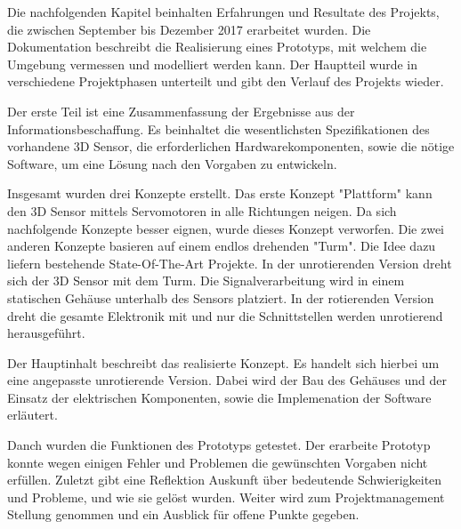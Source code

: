 Die nachfolgenden Kapitel beinhalten Erfahrungen und Resultate des Projekts, die zwischen September bis Dezember 2017 erarbeitet wurden. Die Dokumentation beschreibt die Realisierung eines Prototyps, mit welchem die Umgebung vermessen und modelliert werden kann. Der Hauptteil wurde in verschiedene Projektphasen unterteilt und gibt den Verlauf des Projekts wieder.

Der erste Teil ist eine Zusammenfassung der Ergebnisse aus der Informationsbeschaffung. Es beinhaltet die wesentlichsten Spezifikationen des vorhandene 3D Sensor, die erforderlichen Hardwarekomponenten, sowie die nötige Software, um eine Lösung nach den Vorgaben zu entwickeln. 

Insgesamt wurden drei Konzepte erstellt. Das erste Konzept "Plattform" kann den 3D Sensor mittels Servomotoren in alle Richtungen neigen. Da sich nachfolgende Konzepte besser eignen, wurde dieses Konzept verworfen. Die zwei anderen Konzepte basieren auf einem endlos drehenden "Turm". Die Idee dazu liefern bestehende State-Of-The-Art Projekte. In der unrotierenden Version dreht sich der 3D Sensor mit dem Turm. Die Signalverarbeitung wird in einem statischen Gehäuse unterhalb des Sensors platziert. In der rotierenden Version dreht die gesamte Elektronik mit und nur die Schnittstellen werden unrotierend herausgeführt.

Der Hauptinhalt beschreibt das realisierte Konzept. Es handelt sich hierbei um eine angepasste unrotierende Version. Dabei wird der Bau des Gehäuses und der Einsatz der elektrischen Komponenten, sowie die Implemenation der Software erläutert.

Danch wurden die Funktionen des Prototyps getestet. Der erarbeite Prototyp konnte wegen einigen Fehler und Problemen die gewünschten Vorgaben nicht erfüllen. Zuletzt gibt eine Reflektion Auskunft über bedeutende Schwierigkeiten und Probleme, und wie sie gelöst wurden. Weiter wird zum Projektmanagement Stellung genommen und ein Ausblick für offene Punkte gegeben.





